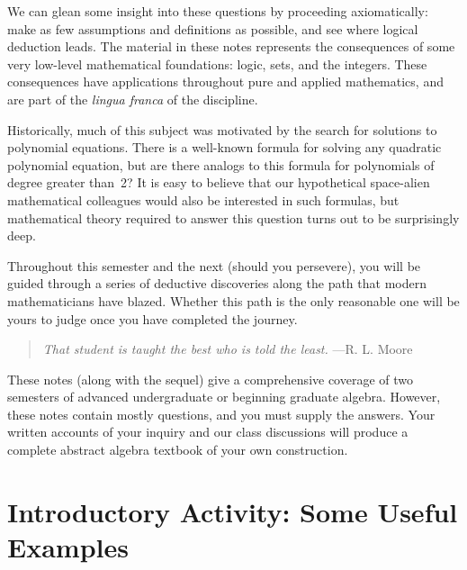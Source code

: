 We can glean some insight into these questions by proceeding axiomatically: make as few assumptions and definitions as possible, and see where logical deduction leads. The material in these notes represents the consequences of some very low-level mathematical foundations: logic, sets, and the integers. These consequences have applications throughout pure and applied mathematics, and are part of the \textit{lingua franca} of the discipline.

Historically, much of this subject was motivated by the search for solutions to polynomial equations.  There is a well-known formula for solving any quadratic polynomial equation, but are there analogs to this formula for polynomials of degree greater than~2? It is easy to believe that our hypothetical space-alien mathematical colleagues would also be interested in such formulas, but mathematical theory required to answer this question turns out to be surprisingly deep.

 Throughout this semester and the next (should you persevere), you will be guided through a series of deductive discoveries along the path that modern mathematicians have blazed. Whether this path is the only reasonable one will be yours to judge once you have completed the journey.

\begin{quote}
  \textit{That student is taught the best who is told the least.} ---R. L. Moore
\end{quote}

These notes (along with the sequel) give a comprehensive coverage of two semesters of advanced undergraduate or beginning graduate algebra. However, these notes contain mostly questions, and you must supply the answers. Your written accounts of your inquiry and our class discussions will produce a complete abstract algebra textbook of your own construction.

\mainmatter

\chapter*{Introductory Activity: Some Useful Examples}

